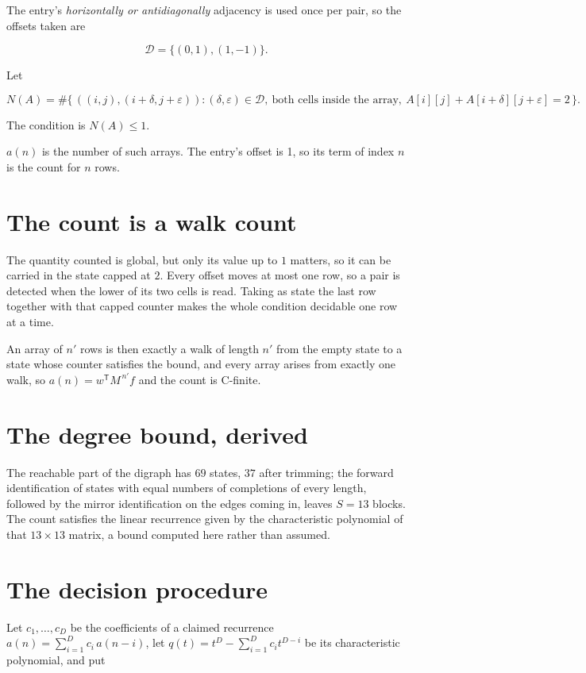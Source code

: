 \documentclass[11pt]{article}
\theoremstyle{definition}
\begin{document}
The entry's {\itshape horizontally or antidiagonally} adjacency is used once per pair, so the offsets taken are

\[\mathcal{D} = \{(0,1), (1,-1)\}.\]

Let

\[N(A) = \#\bigl\{\,((i,j),(i{+}\delta,j{+}\varepsilon)) : (\delta,\varepsilon) \in \mathcal{D},\ \text{both cells inside the array},\ A[i][j] + A[i{+}\delta][j{+}\varepsilon] = 2\,\bigr\}.\]

The condition is $N(A) \le 1$.

$a(n)$ is the number of such arrays. The entry's offset is 1, so its term of index $n$ is the count for $n$ rows.

\section{The count is a walk count}

The quantity counted is global, but only its value up to $1$ matters, so it can be carried in the state capped at $2$. Every offset moves at most one row, so a pair is detected when the lower of its two cells is read. Taking as state the last row together with that capped counter makes the whole condition decidable one row at a time.

An array of $n'$ rows is then exactly a walk of length $n'$ from the empty state to a state whose counter satisfies the bound, and every array arises from exactly one walk, so $a(n) = w^{\mathsf T}M^{\,n'}f$ and the count is C-finite.

\section{The degree bound, derived}

The reachable part of the digraph has $69$ states, $37$ after trimming; the forward identification of states with equal numbers of completions of every length, followed by the mirror identification on the edges coming in, leaves $S = 13$ blocks. The count satisfies the linear recurrence given by the characteristic polynomial of that $13\times13$ matrix, a bound computed here rather than assumed.

\section{The decision procedure}

Let $c_1,\dots,c_D$ be the coefficients of a claimed recurrence $a(n) = \sum_{i=1}^{D} c_i\,a(n-i)$, let $q(t) = t^{D} - \sum_{i=1}^{D} c_i t^{D-i}$ be its characteristic polynomial, and put
\end{document}
